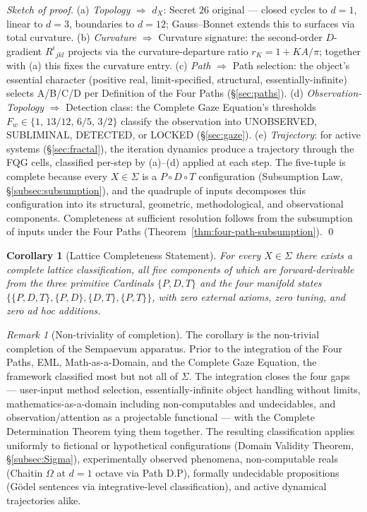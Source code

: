 \documentclass[11pt,a4paper]{article}
\newtheorem{corollary}[theorem]{Corollary}
\theoremstyle{definition}
\theoremstyle{remark}
\newtheorem{remark}[theorem]{Remark}
\begin{document}
\begin{proof}[Sketch of proof]
(a) \emph{Topology} $\Rightarrow$ $d_{X}$: Secret $26$ original --- closed cycles to $d=1$, linear to $d=3$, boundaries to $d=12$; Gauss--Bonnet extends this to surfaces via total curvature. (b) \emph{Curvature} $\Rightarrow$ Curvature signature: the second-order $D$-gradient $R^{i}{}_{jkl}$ projects via the curvature-departure ratio $r_{K} = 1 + KA/\pi$; together with (a) this fixes the curvature entry. (c) \emph{Path} $\Rightarrow$ Path selection: the object's essential character (positive real, limit-specified, structural, essentially-infinite) selects A/B/C/D per Definition of the Four Paths (\S\ref{sec:paths}). (d) \emph{Observation-Topology} $\Rightarrow$ Detection class: the Complete Gaze Equation's thresholds $F_{w} \in \{1,\,13/12,\,6/5,\,3/2\}$ classify the observation into UNOBSERVED, SUBLIMINAL, DETECTED, or LOCKED (\S\ref{sec:gaze}). (e) \emph{Trajectory}: for active systems (\S\ref{sec:fractal}), the iteration dynamics produce a trajectory through the FQG cells, classified per-step by (a)--(d) applied at each step. The five-tuple is complete because every $X\in\Sigma$ is a $P\circ D\circ T$ configuration (Subsumption Law, \S\ref{subsec:subsumption}), and the quadruple of inputs decomposes this configuration into its structural, geometric, methodological, and observational components. Completeness at sufficient resolution follows from the subsumption of inputs under the Four Paths (Theorem~\ref{thm:four-path-subsumption}).
\qed
\end{proof}

\begin{corollary}[Lattice Completeness Statement]\label{cor:completeness}
For every $X\in\Sigma$ there exists a complete lattice classification, all five components of which are forward-derivable from the three primitive Cardinals $\{P,D,T\}$ and the four manifold states $\{\{P,D,T\}, \{P,D\}, \{D,T\}, \{P,T\}\}$, with zero external axioms, zero tuning, and zero ad hoc additions.
\end{corollary}

\begin{remark}[Non-triviality of completion]
The corollary is the non-trivial completion of the Sempaevum apparatus. Prior to the integration of the Four Paths, EML, Math-as-a-Domain, and the Complete Gaze Equation, the framework classified most but not all of $\Sigma$. The integration closes the four gaps --- user-input method selection, essentially-infinite object handling without limits, mathematics-as-a-domain including non-computables and undecidables, and observation/attention as a projectable functional --- with the Complete Determination Theorem tying them together. The resulting classification applies uniformly to fictional or hypothetical configurations (Domain Validity Theorem, \S\ref{subsec:Sigma}), experimentally observed phenomena, non-computable reals (Chaitin $\Omega$ at $d=1$ octave via Path D.P), formally undecidable propositions (G\"odel sentences via integrative-level classification), and active dynamical trajectories alike.
\end{remark}
\end{document}
